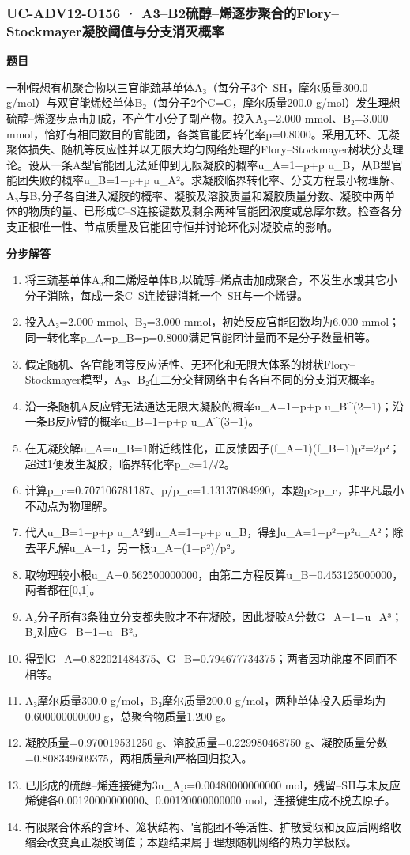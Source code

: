\documentclass[UTF8,11pt,a4paper]{ctexart}
\begin{document}
\subsubsection*{UC-ADV12-O156 · A3–B2硫醇–烯逐步聚合的Flory–Stockmayer凝胶阈值与分支消灭概率}
\noindent\textbf{题目}\par
一种假想有机聚合物以三官能巯基单体A₃（每分子3个–SH，摩尔质量300.0 g/mol）与双官能烯烃单体B₂（每分子2个C=C，摩尔质量200.0 g/mol）发生理想硫醇–烯逐步点击加成，不产生小分子副产物。投入A₃=2.000 mmol、B₂=3.000 mmol，恰好有相同数目的官能团，各类官能团转化率p=0.8000。采用无环、无凝聚体损失、随机等反应性并以无限大均匀网络处理的Flory–Stockmayer树状分支理论。设从一条A型官能团无法延伸到无限凝胶的概率u\_A=1−p+p u\_B，从B型官能团失败的概率u\_B=1−p+p u\_A²。求凝胶临界转化率、分支方程最小物理解、A₃与B₂分子各自进入凝胶的概率、凝胶及溶胶质量和凝胶质量分数、凝胶中两单体的物质的量、已形成C–S连接键数及剩余两种官能团浓度或总摩尔数。检查各分支正根唯一性、节点质量及官能团守恒并讨论环化对凝胶点的影响。\par
\medskip\noindent\textbf{分步解答}
\begin{enumerate}
\item 将三巯基单体A₃和二烯烃单体B₂以硫醇–烯点击加成聚合，不发生水或其它小分子消除，每成一条C–S连接键消耗一个–SH与一个烯键。
\item 投入A₃=2.000 mmol、B₂=3.000 mmol，初始反应官能团数均为6.000 mmol；同一转化率p\_A=p\_B=p=0.8000满足官能团计量而不是分子数量相等。
\item 假定随机、各官能团等反应活性、无环化和无限大体系的树状Flory–Stockmayer模型，A₃、B₂在二分交替网络中有各自不同的分支消灭概率。
\item 沿一条随机A反应臂无法通达无限大凝胶的概率u\_A=1−p+p u\_B\textasciicircum{}(2−1)；沿一条B反应臂的概率u\_B=1−p+p u\_A\textasciicircum{}(3−1)。
\item 在无凝胶解u\_A=u\_B=1附近线性化，正反馈因子(f\_A−1)(f\_B−1)p²=2p²；超过1便发生凝胶，临界转化率p\_c=1/√2。
\item 计算p\_c=0.707106781187、p/p\_c=1.13137084990，本题p>p\_c，非平凡最小不动点为物理解。
\item 代入u\_B=1−p+p u\_A²到u\_A=1−p+p u\_B，得到u\_A=1−p²+p²u\_A²；除去平凡解u\_A=1，另一根u\_A=(1−p²)/p²。
\item 取物理较小根u\_A=0.562500000000，由第二方程反算u\_B=0.453125000000，两者都在[0,1]。
\item A₃分子所有3条独立分支都失败才不在凝胶，因此凝胶A分数G\_A=1−u\_A³；B₂对应G\_B=1−u\_B²。
\item 得到G\_A=0.822021484375、G\_B=0.794677734375；两者因功能度不同而不相等。
\item A₃摩尔质量300.0 g/mol，B₂摩尔质量200.0 g/mol，两种单体投入质量均为0.600000000000 g，总聚合物质量1.200 g。
\item 凝胶质量=0.970019531250 g、溶胶质量=0.229980468750 g、凝胶质量分数=0.808349609375，两相质量和严格回归投入。
\item 已形成的硫醇–烯连接键为3n\_Ap=0.00480000000000 mol，残留–SH与未反应烯键各0.00120000000000、0.00120000000000 mol，连接键生成不脱去原子。
\item 有限聚合体系的含环、笼状结构、官能团不等活性、扩散受限和反应后网络收缩会改变真正凝胶阈值；本题结果属于理想随机网络的热力学极限。
\end{enumerate}
\end{document}
